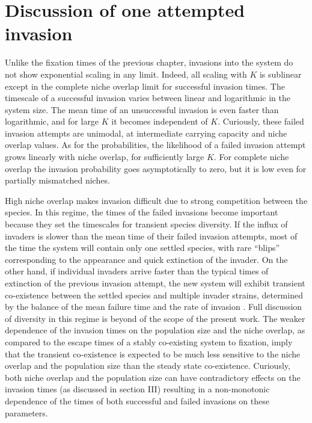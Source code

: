 \section{Discussion of one attempted invasion} \label{DiscussionOfOneAttemptedInvasion}
Unlike the fixation times of the previous chapter, invasions into the system do not show exponential scaling in any limit. 
Indeed, all scaling with $K$ is sublinear except in the complete niche overlap limit for successful invasion times. 
The timescale of a successful invasion varies between linear and logarithmic in the system size. 
The mean time of an unsuccessful invasion is even faster than logarithmic, and for large $K$ it becomes independent of $K$. 
Curiously, these failed invasion attempts are unimodal, at intermediate carrying capacity and niche overlap values. %
As for the probabilities, the likelihood of a failed invasion attempt grows linearly with niche overlap, for sufficiently large $K$. 
For complete niche overlap the invasion probability goes asymptotically to zero, but it is low even for partially mismatched niches. 

High niche overlap makes invasion difficult due to strong competition between the species. 
In this regime, the times of the failed invasions become important because they set the timescales for transient species diversity. 
If the influx of invaders is slower than the mean time of their failed invasion attempts, most of the time the system will contain only one settled species, with rare ``blips'' corresponding to the appearance and quick extinction of the invader. 
On the other hand, if individual invaders arrive faster than the typical times of extinction of the previous invasion attempt, the new system will exhibit transient co-existence between the settled species and multiple invader strains, determined by the balance of the mean failure time and the rate of invasion \cite{Dias1996,Hubbell2001,Chesson2000}. 
Full discussion of diversity in this regime is beyond of the scope of the present work. %
The weaker dependence of the invasion times on the population size and the niche overlap, as compared to the escape times of a stably co-existing system to fixation, imply that the transient co-existence is expected to be much less sensitive to the niche overlap and the population size than the steady state co-existence. 
Curiously, both niche overlap and the population size can have contradictory effects on the invasion times (as discussed in section III) resulting in a non-monotonic dependence of the times of both successful and failed invasions on these parameters.%

